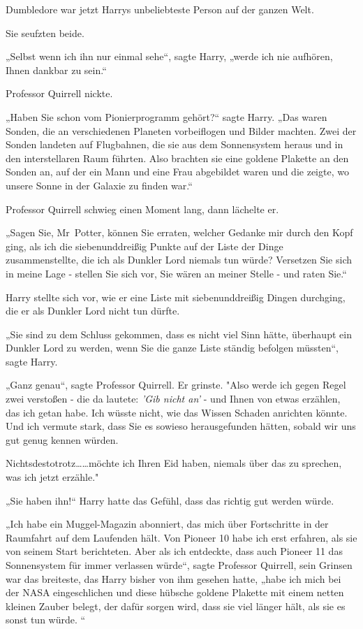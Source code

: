{Dumbledore war jetzt Harrys unbeliebteste Person auf der ganzen Welt.

Sie seufzten beide.

„Selbst wenn ich ihn nur einmal sehe“, sagte Harry, „werde ich nie aufhören, Ihnen dankbar zu sein.“

Professor Quirrell nickte.

„Haben Sie schon vom Pionierprogramm gehört?“ sagte Harry. „Das waren Sonden, die an verschiedenen Planeten vorbeiflogen und Bilder machten. Zwei der Sonden landeten auf Flugbahnen, die sie aus dem Sonnensystem heraus und in den interstellaren Raum führten. Also brachten sie eine goldene Plakette an den Sonden an, auf der ein Mann und eine Frau abgebildet waren und die zeigte, wo unsere Sonne in der Galaxie zu finden war.“

Professor Quirrell schwieg einen Moment lang, dann lächelte er.

„Sagen Sie, Mr~Potter, können Sie erraten, welcher Gedanke mir durch den Kopf ging, als ich die siebenunddreißig Punkte auf der Liste der Dinge zusammenstellte, die ich als Dunkler Lord niemals tun würde? Versetzen Sie sich in meine Lage - stellen Sie sich vor, Sie wären an meiner Stelle - und raten Sie.“

Harry stellte sich vor, wie er eine Liste mit siebenunddreißig Dingen durchging, die er als Dunkler Lord nicht tun dürfte.

„Sie sind zu dem Schluss gekommen, dass es nicht viel Sinn hätte, überhaupt ein Dunkler Lord zu werden, wenn Sie die ganze Liste ständig befolgen müssten“, sagte Harry.

„Ganz genau“, sagte Professor Quirrell. Er grinste. "Also werde ich gegen Regel zwei verstoßen - die da lautete: \emph{'Gib nicht an'} - und Ihnen von etwas erzählen, das ich getan habe. Ich wüsste nicht, wie das Wissen Schaden anrichten könnte. Und ich vermute stark, dass Sie es sowieso herausgefunden hätten, sobald wir uns gut genug kennen würden.

Nichtsdestotrotz……möchte ich Ihren Eid haben, niemals über das zu sprechen, was ich jetzt erzähle."

„Sie haben ihn!“ Harry hatte das Gefühl, dass das richtig gut werden würde.

„Ich habe ein Muggel-Magazin abonniert, das mich über Fortschritte in der Raumfahrt auf dem Laufenden hält. Von Pioneer 10 habe ich erst erfahren, als sie von seinem Start berichteten. Aber als ich entdeckte, dass auch Pioneer 11 das Sonnensystem für immer verlassen würde“, sagte Professor Quirrell, sein Grinsen war das breiteste, das Harry bisher von ihm gesehen hatte, „habe ich mich bei der NASA eingeschlichen und diese hübsche goldene Plakette mit einem netten kleinen Zauber belegt, der dafür sorgen wird, dass sie viel länger hält, als sie es sonst tun würde. “

}
